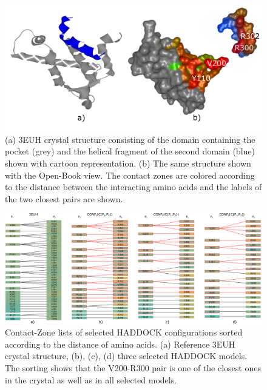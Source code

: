 \documentclass{bmcart}
\def\OpBook {Open-Book view\xspace}
\def\CoZoLists{Contact-Zone lists\xspace}
\begin{document}
\begin{backmatter}
\begin{figure}[h!]
    \centering
    \includegraphics[width=\columnwidth]{images/figure15.pdf}
    \caption{(a) 3EUH crystal structure consisting of the domain containing the pocket (grey) and the helical fragment of the second domain (blue) shown with cartoon representation. (b) The same structure shown with the \OpBook. The contact zones are colored according to the distance between the interacting amino acids and the labels of the two closest pairs are shown.}
  \label{fig:MukEF_crystal_3EUH_selected}
\end{figure}

\begin{figure}[h!]
    \centering
    \includegraphics[width=\columnwidth]{images/figure16.pdf}
    \caption{ \CoZoLists of selected HADDOCK configurations sorted according to the distance of amino acids. (a) Reference 3EUH crystal structure, (b), (c), (d) three selected HADDOCK models. The sorting shows that the V200-R300 pair is one of the closest ones in the crystal as well as in all selected models.}
  \label{fig:list_pocket_string}
\end{figure}


\end{backmatter}
\end{document}

